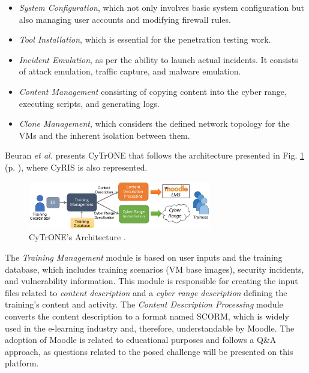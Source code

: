 \begin{itemize}
    \item \textit{System Configuration}, which not only involves basic system configuration but also managing user accounts and modifying firewall rules.
    \item \textit{Tool Installation}, which is essential for the penetration testing work.
    \item \textit{Incident Emulation}, as per the ability to launch actual incidents. It consists of attack emulation, traffic capture, and malware emulation.
    \item \textit{Content Management} consisting of copying content into the cyber range, executing scripts, and generating logs.
    \item \textit{Clone Management}, which considers the defined network topology for the VMs and the inherent isolation between them.
\end{itemize}

Beuran \textit{et al.} \cite{cytrone_ref} presents CyTrONE that follows the architecture presented in Fig. \ref{fig:cytrone_architecture} (p. \pageref{fig:cytrone_architecture}), where CyRIS is also represented.

\begin{figure}[H]
    \includegraphics[width=8cm]{figures/cytrone_architecture.png}
    \caption{CyTrONE's Architecture \cite{cytrone_ref}.}
    \label{fig:cytrone_architecture}
\end{figure}

The \textit{Training Management} module is based on user inputs and the training database, which includes training scenarios (VM base images), security incidents, and vulnerability information. This module is responsible for creating the input files related to \textit{content description} and a \textit{cyber range description} defining the training's content and activity. The \textit{Content Description Processing} module converts the content description to a format named SCORM, which is widely used in the e-learning industry and, therefore,  understandable by Moodle. The adoption of Moodle is related to educational purposes and follows a Q\&A approach, as questions related to the posed challenge will be presented on this platform.

